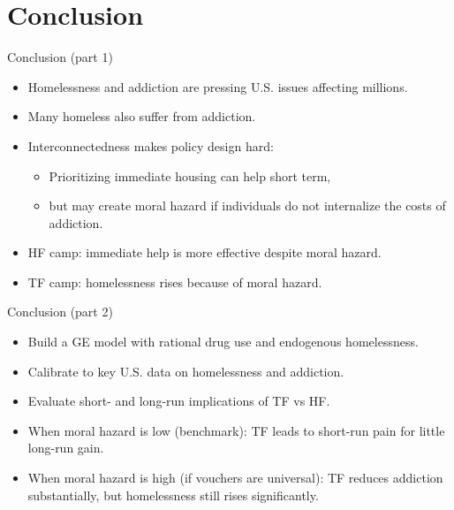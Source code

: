 \documentclass[10pt,aspectratio=169]{beamer}
\begin{document}
\section{Conclusion}

\begin{frame}{Conclusion (part 1)}
\begin{itemize}
\item Homelessness and addiction are pressing U.S. issues affecting millions.
\item Many homeless also suffer from addiction.
\item Interconnectedness makes policy design hard:
\begin{itemize}
\item Prioritizing immediate housing can help short term,
\item but may create moral hazard if individuals do not internalize the costs of addiction.
\end{itemize}
\item HF camp: immediate help is more effective despite moral hazard.
\item TF camp: homelessness rises because of moral hazard.
\end{itemize}
\end{frame}

\begin{frame}{Conclusion (part 2)}
\begin{itemize}
\item Build a GE model with rational drug use and endogenous homelessness.
\item Calibrate to key U.S. data on homelessness and addiction.
\item Evaluate short- and long-run implications of TF vs HF.
\item When moral hazard is low (benchmark): TF leads to short-run pain for little long-run gain.
\item When moral hazard is high (if vouchers are universal): TF reduces addiction substantially,
but homelessness still rises significantly.
\end{itemize}
\end{frame}
\end{document}
